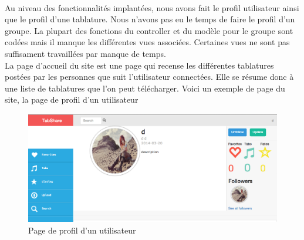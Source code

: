 \paragraph{}
Au niveau des fonctionnalités implantées, nous avons fait le profil utilisateur ainsi que le profil d'une tablature. Nous n'avons pas eu le temps de faire le profil d'un groupe. La plupart des fonctions du controller et du modèle pour le groupe sont codées mais il manque les différentes vues associées. Certaines vues ne sont pas suffisament travaillées par manque de temps. \\
La page d'accueil du site est une page qui recense les différentes tablatures postées par les personnes que suit l'utilisateur connectées.
Elle se résume donc à une liste de tablatures que l'on peut télécharger.
Voici un exemple de page du site, la page de profil d'un utilisateur

\begin{figure}[H]
\centering
\includegraphics[scale=0.3]{profilUserWeb}
\caption{Page de profil d'un utilisateur}
\end{figure}
